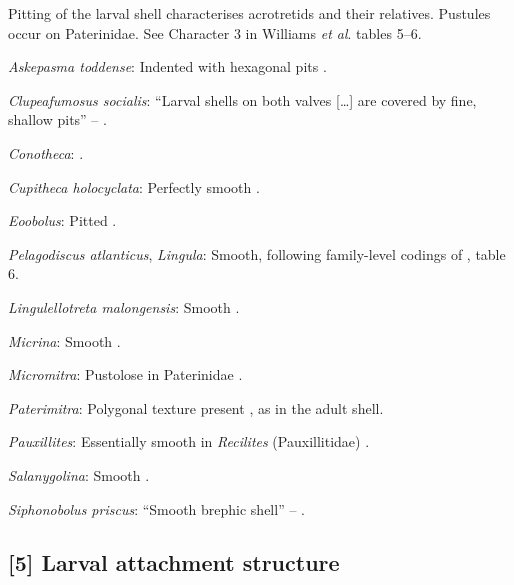 \documentclass[openany]{book}
\begin{document}
Pitting of the larval shell characterises acrotretids and their
relatives. Pustules occur on Paterinidae. See Character 3 in Williams
\emph{et al}. \citeyearpar{Williams2000LinguliformeaCraniiformea} tables
5--6.

\hypertarget{Askepasma_toddense-coding-4}{}
\emph{Askepasma toddense}: Indented with hexagonal pits \citep[appendix
2]{Williams1998Thediversity}.

\hypertarget{Clupeafumosus_socialis-coding-4}{}
\emph{Clupeafumosus socialis}: ``Larval shells on both valves
{[}\ldots{}{]} are covered by fine, shallow pits'' --
\citet{Topper2013Reappraisalof}.

\hypertarget{Conotheca-coding-4}{}
\emph{Conotheca}: \citep{Wrona2003}.

\hypertarget{Cupitheca_holocyclata-coding-4}{}
\emph{Cupitheca holocyclata}: Perfectly smooth \citep{Skovsted2016}.

\hypertarget{Eoobolus-coding-4}{}
\emph{Eoobolus}: Pitted \citep[table
8]{Williams2000LinguliformeaCraniiformea}.

\hypertarget{Lingula-coding-4}{}
\emph{Pelagodiscus atlanticus}, \emph{Lingula}: Smooth, following
family-level codings of \citet{Williams2000LinguliformeaCraniiformea},
table 6.

\hypertarget{Lingulellotreta_malongensis-coding-4}{}
\emph{Lingulellotreta malongensis}: Smooth
\citep{Holmer1997EarlyCambrian, Li2004}.

\hypertarget{Micrina-coding-4}{}
\emph{Micrina}: Smooth \citep{Holmer2011Firstrecord}.

\hypertarget{Micromitra-coding-4}{}
\emph{Micromitra}: Pustolose in Paterinidae \citep[table
6]{Williams2000LinguliformeaCraniiformea}.

\hypertarget{Paterimitra-coding-4}{}
\emph{Paterimitra}: Polygonal texture present
\citep{Holmer2011Firstrecord}, as in the adult shell.

\hypertarget{Pauxillites-coding-4}{}
\emph{Pauxillites}: Essentially smooth in \emph{Recilites}
(Pauxillitidae) \citep{Dzik1978}.

\hypertarget{Salanygolina-coding-4}{}
\emph{Salanygolina}: Smooth \citep{Holmer2009Theenigmatic}.

\hypertarget{Siphonobolus_priscus-coding-4}{}
\emph{Siphonobolus priscus}: ``Smooth brephic shell'' --
\citet{Popov2009Earlyontogeny}.

\subsection*{{[}5{]} Larval attachment
structure}\label{larval-attachment-structure}
\end{document}
